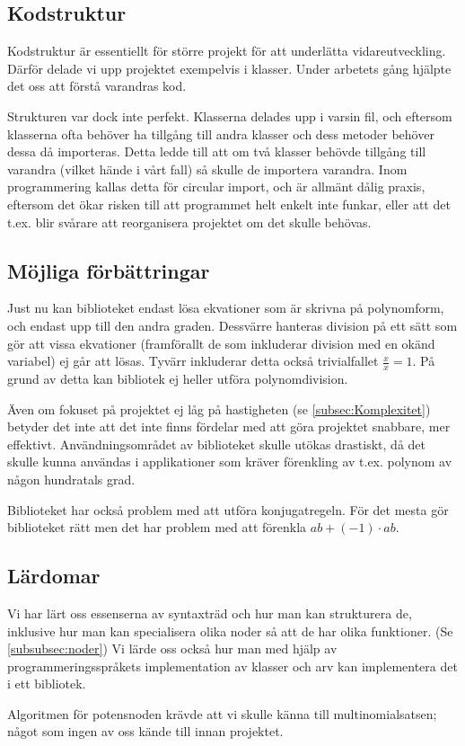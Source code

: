 \documentclass[12pt,a4paper]{article}
\begin{document}
\subsection{Kodstruktur}
Kodstruktur är essentiellt för större projekt för att underlätta vidareutveckling. Därför delade vi upp projektet exempelvis i klasser. Under arbetets gång hjälpte det oss att förstå varandras kod.
\par
Strukturen var dock inte perfekt. Klasserna delades upp i varsin fil, och eftersom klasserna ofta behöver ha tillgång till andra klasser och dess metoder behöver dessa då importeras. Detta ledde till att om två klasser behövde tillgång till varandra (vilket hände i vårt fall) så skulle de importera varandra. Inom programmering kallas detta för circular import, och är allmänt dålig praxis, eftersom det ökar risken till att programmet helt enkelt inte funkar, eller att det t.ex. blir svårare att reorganisera projektet om det skulle behövas.
\subsection{Möjliga förbättringar}
Just nu kan biblioteket endast lösa ekvationer som är skrivna på polynomform, och endast upp till den andra graden. Dessvärre hanteras division på ett sätt som gör att vissa ekvationer (framförallt de som inkluderar division med en okänd variabel) ej går att lösas. Tyvärr inkluderar detta också trivialfallet \( \frac{x}{x} = 1 \). På grund av detta kan bibliotek ej heller utföra polynomdivision.
\par
Även om fokuset på projektet ej låg på hastigheten (se \ref{subsec:Komplexitet}) betyder det inte att det inte finns fördelar med att göra projektet snabbare, mer effektivt. Användningsområdet av biblioteket skulle utökas drastiskt, då det skulle kunna användas i applikationer som kräver förenkling av t.ex. polynom av någon hundratals grad.
\par
Biblioteket har också problem med att utföra konjugatregeln. För det mesta gör biblioteket rätt men det har problem med att förenkla \( ab + (-1) \cdot ab\).
\subsection{Lärdomar}
Vi har lärt oss essenserna av syntaxträd och hur man kan strukturera de, inklusive hur man kan specialisera olika noder så att de har olika funktioner. (Se \ref{subsubsec:noder}) Vi lärde oss också hur man med hjälp av programmeringsspråkets implementation av klasser och arv kan implementera det i ett bibliotek.
\par
Algoritmen för potensnoden krävde att vi skulle känna till multinomialsatsen; något som ingen av oss kände till innan projektet.
\end{document}
